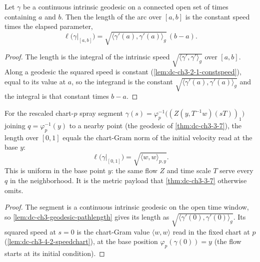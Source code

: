 \begin{lemma}
  \label{lem:dc-ch3-geodesic-pathlength}
  \leanok
  Let $\gamma$ be a continuous intrinsic geodesic on a connected open set of times containing
  $a$ and $b$. Then the length of the arc over $[a,b]$ is the constant speed times the elapsed
  parameter,
  \[
    \ell\big(\gamma|_{[a,b]}\big)=\sqrt{\langle\gamma'(a),\gamma'(a)\rangle_g}\,(b-a).
  \]
\end{lemma}
\begin{proof}
  \sketch
  \leanok
  The length is the integral of the intrinsic speed $\sqrt{\langle\gamma',\gamma'\rangle_g}$ over
  $[a,b]$. Along a geodesic the squared speed is constant (\cref{lem:dc-ch3-2-1-constspeed}), equal
  to its value at $a$, so the integrand is the constant $\sqrt{\langle\gamma'(a),\gamma'(a)\rangle_g}$
  and the integral is that constant times $b-a$.
\end{proof}

\begin{lemma}
  \label{lem:dc-ch3-4-2-segment-length}
  \leanok
  For the rescaled chart-$p$ spray segment $\gamma(s)=\varphi_p^{-1}\big((Z(y,T^{-1}w)(sT))_1\big)$
  joining $q=\varphi_p^{-1}(y)$ to a nearby point (the geodesic of \cref{thm:dc-ch3-3-7}), the length
  over $[0,1]$ equals the chart-Gram norm of the initial velocity read at the base $y$:
  \[
    \ell\big(\gamma|_{[0,1]}\big)=\sqrt{\langle w,w\rangle_{p,y}}.
  \]
  This is uniform in the base point $y$: the same flow $Z$ and time scale $T$ serve every $q$ in the
  neighborhood. It is the metric payload that \cref{thm:dc-ch3-3-7} otherwise omits.
\end{lemma}
\begin{proof}
  \sketch
  \leanok
  The segment is a continuous intrinsic geodesic on the open time window, so
  \cref{lem:dc-ch3-geodesic-pathlength} gives its length as
  $\sqrt{\langle\gamma'(0),\gamma'(0)\rangle_g}$. Its squared speed at $s=0$ is the chart-Gram value
  $\langle w,w\rangle$ read in the fixed chart at $p$ (\cref{lem:dc-ch3-4-2-speedchart}), at the base
  position $\varphi_p(\gamma(0))=y$ (the flow starts at its initial condition).
\end{proof}

